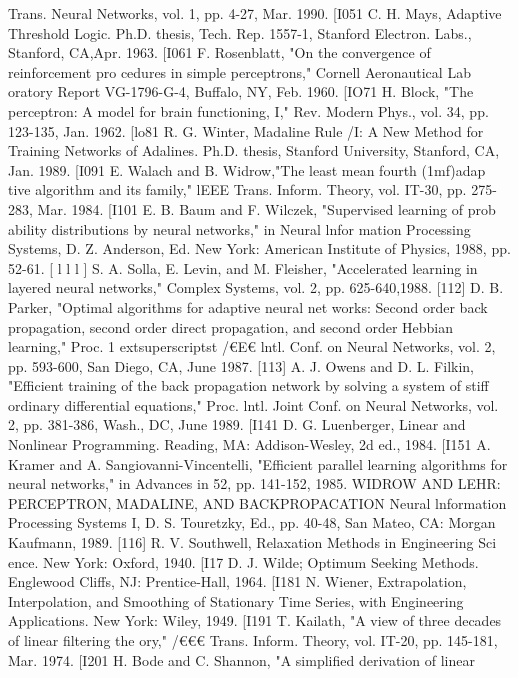 \documentclass[11pt,a4paper,twocolumn]{article}
\begin{document}
{{Trans. Neural Networks, vol. 1, pp. 4-27, Mar. 1990. 
[I051 C. H. Mays, Adaptive Threshold Logic. Ph.D. thesis, Tech. 
Rep. 1557-1, Stanford Electron. Labs., Stanford, CA,Apr. 1963. 
[I061 F. Rosenblatt, "On the convergence of reinforcement pro
cedures in simple perceptrons," Cornell Aeronautical Lab
oratory Report VG-1796-G-4, Buffalo, NY, Feb. 1960. 
[IO71 H. Block, "The perceptron: A model for brain functioning, 
I," Rev. Modern Phys., vol. 34, pp. 123-135, Jan. 1962. 
[lo81 R. G. Winter, Madaline Rule /I: A New Method for Training 
Networks of Adalines. Ph.D. thesis, Stanford University, 
Stanford, CA, Jan. 1989. 
[I091 E. Walach and B. Widrow,"The least mean fourth (1mf)adap
tive algorithm and its family," lEEE Trans. Inform. Theory, 
vol. IT-30, pp. 275-283, Mar. 1984. 
[I101 E. B. Baum and F. Wilczek, "Supervised learning of prob
ability distributions by neural networks," in Neural lnfor
mation Processing Systems, D. Z. Anderson, Ed. New York: 
American Institute of Physics, 1988, pp. 52-61. 
[ l l l ]  S. A. Solla, E. Levin, and M. Fleisher, "Accelerated learning 
in layered neural networks," Complex Systems, vol. 2, pp. 
625-640,1988. 
[112] D. B. Parker, "Optimal algorithms for adaptive neural net
works: Second order back propagation, second order direct 
propagation, and second order Hebbian learning," Proc. 1	extsuperscript{st} 
/€E€ lntl. Conf. on Neural Networks, vol. 2, pp. 593-600, San 
Diego, CA, June 1987. 
[113] A. J. Owens and D. L. Filkin, "Efficient training of the back 
propagation network by solving a system of stiff ordinary 
differential equations," Proc. lntl. Joint Conf. on Neural 
Networks, vol. 2, pp. 381-386, Wash., DC, June 1989. 
[I141 D. G. Luenberger, Linear and Nonlinear Programming. 
Reading, MA: Addison-Wesley, 2d ed., 1984. 
[I151 A. Kramer and A. Sangiovanni-Vincentelli, "Efficient parallel 
learning algorithms for neural networks," in Advances in 
52, pp. 141-152, 1985. 
WIDROW AND LEHR: PERCEPTRON, MADALINE, AND BACKPROPACATION 
Neural lnformation Processing Systems I, D. S. Touretzky, 
Ed., pp. 40-48, San Mateo, CA: Morgan Kaufmann, 1989. 
[116] R. V. Southwell, Relaxation Methods in Engineering Sci
ence. New York: Oxford, 1940. 
[I17 D. J. Wilde; Optimum Seeking Methods. Englewood Cliffs, 
NJ: Prentice-Hall, 1964. 
[I181 N. Wiener, Extrapolation, Interpolation, and Smoothing of 
Stationary Time Series, with Engineering Applications. New 
York: Wiley, 1949. 
[I191 T. Kailath, "A view of three decades of linear filtering the
ory," /€€€ Trans. Inform. Theory, vol. IT-20, pp. 145-181, Mar. 
1974. 
[I201 H. Bode and C. Shannon, "A simplified derivation of linear 
}}
\end{document}
